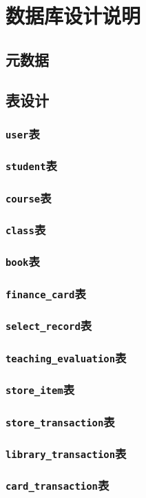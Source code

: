 \ifx\maindoc\undefined
{}
\fi

\section{数据库设计说明}
\subsection{元数据}
\subsection{表设计}
\subsubsection{\texttt{user}表}
\subsubsection{\texttt{student}表}
\subsubsection{\texttt{course}表}
\subsubsection{\texttt{class}表}
\subsubsection{\texttt{book}表}
\subsubsection{\texttt{finance\_card}表}
\subsubsection{\texttt{select\_record}表}
\subsubsection{\texttt{teaching\_evaluation}表}
\subsubsection{\texttt{store\_item}表}
\subsubsection{\texttt{store\_transaction}表}
\subsubsection{\texttt{library\_transaction}表}
\subsubsection{\texttt{card\_transaction}表}